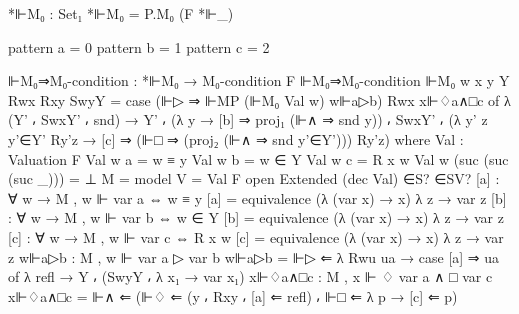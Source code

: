 \begin{spverbatim}
  *⊩M₀ : Set₁
  *⊩M₀ = P.M₀ (F *⊩_)

  pattern a = 0
  pattern b = 1
  pattern c = 2

  ⊩M₀⇒M₀-condition : *⊩M₀ → M₀-condition F
  ⊩M₀⇒M₀-condition ⊩M₀ {w} {x} {y} {Y} Rwx Rxy SwyY
    = case (⊩▷ ⇒ ⊩MP (⊩M₀ Val w) w⊩a▷b) Rwx x⊩♢a∧□c of
      λ { (Y' ⸴ SwxY' ⸴ snd) → Y' ⸴ (λ {y → [b] ⇒ proj₁ (⊩∧ ⇒ snd y)})
      ⸴ SwxY' ⸴ (λ { {y'} z y'∈Y' Ry'z → [c] ⇒ (⊩□ ⇒ (proj₂ (⊩∧ ⇒ snd y'∈Y'))) Ry'z})}
    where
    Val : Valuation F
    Val w a = w ≡ y
    Val w b = w ∈ Y
    Val w c = R x w
    Val w (suc (suc (suc _))) = ⊥
    M = model {V = Val} F
    open Extended (dec Val) ∈S? ∈SV?
    [a] : ∀ {w} → M , w ⊩ var a ⇔ w ≡ y
    [a] = equivalence (λ { (var x) → x}) λ {z → var z}
    [b] : ∀ {w} → M , w ⊩ var b ⇔ w ∈ Y
    [b] = equivalence (λ { (var x) → x}) λ {z → var z}
    [c] : ∀ {w} → M , w ⊩ var c ⇔ R x w
    [c] = equivalence (λ { (var x) → x}) λ {z → var z}
    w⊩a▷b : M , w ⊩ var a ▷ var b
    w⊩a▷b = ⊩▷ ⇐ λ {Rwu ua → case [a] ⇒ ua of λ {refl → Y ⸴ (SwyY ⸴ λ {x₁ → var x₁})}}
    x⊩♢a∧□c : M , x ⊩ ♢ var a ∧ □ var c
    x⊩♢a∧□c = ⊩∧ ⇐ (⊩♢ ⇐ (y ⸴ Rxy ⸴ [a] ⇐ refl) ⸴ ⊩□ ⇐ λ {p → [c] ⇐ p})
\end{spverbatim}
